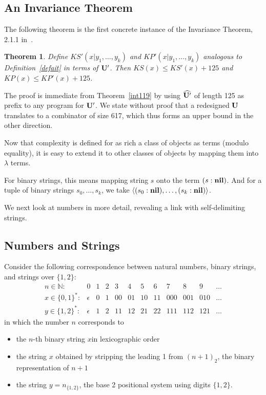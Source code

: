 \documentclass{article}
\newtheorem{theorem}{Theorem}
\newcommand{\tup}[1]{\langle #1 \rangle}
\newcommand{\pref}[2]{(#1:#2)}
\newcommand{\CU}{{\bf U}}
\newcommand{\Cnil}{{\bf nil}}
\begin{document}
\subsection{An Invariance Theorem}

The following theorem is the first concrete instance of the
Invariance Theorem, 2.1.1 in~\cite{lv}.

\begin{theorem}
Define $KS'(x|y_1,\ldots,y_{k})$ and $KP'(x|y_1,\ldots,y_{k})$
analogous to Definition~\ref{defait} in terms of $\CU'$.
Then $KS(x) \leq KS'(x)+125$ and $KP(x) \leq KP'(x)+125$.
\end{theorem}

The proof is immediate from
Theorem~\ref{int119} by using $\widehat{\CU'}$ of length 125 as
prefix to any program for $\CU'$.
We state without proof that
a redesigned $\CU$ translates to a combinator of size 617,
which thus forms an upper bound in the other direction.

Now that complexity is defined for as rich a class of objects as
terms (modulo equality), it is easy to extend it to other
classes of objects by mapping them into $\lambda$ terms.%

For binary strings, this means mapping string $s$ onto the term
$\pref{s}{\Cnil}$. And for a tuple of binary strings $s_0,\ldots,s_k$,
we take $\tup{\pref{s_0}{\Cnil},\ldots,\pref{s_k}{\Cnil}}$.

We next look at numbers in more detail, revealing a link with
self-delimiting strings.

\subsection{Numbers and Strings}

Consider the following correspondence between
natural numbers, binary strings, and strings over $\{1,2\}$:
\[
\begin{array}{rccccccccccc}
n \in {\mathbb N}:    &        0 & 1 & 2 &  3 &  4 &  5 &  6 &   7 &   8 &   9 & \ldots \\
x \in \{0,1\}^{\ast}: & \epsilon & 0 & 1 & 00 & 01 & 10 & 11 & 000 & 001 & 010 & \ldots \\
y \in \{1,2\}^{\ast}: & \epsilon & 1 & 2 & 11 & 12 & 21 & 22 & 111 & 112 & 121 & \ldots
\end{array}
\]
in which the number $n$ corresponds to
\begin{itemize}
\item the $n$-th binary string $x$in lexicographic order
\item the string $x$ obtained by stripping the leading 1 from $(n+1)_2$,
the binary representation of $n+1$
\item the string $y=n_{\{1,2\}}$, the base 2 positional system using digits $\{1,2\}$.
\end{itemize}
\end{document}
